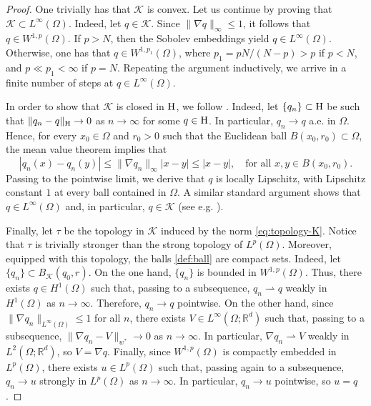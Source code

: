 \documentclass{article}
\newcommand{\boK}{\mathcal{K}}
\newcommand{\R}{\mathbb{R}}
\newcommand{\Hilb}{{\textnormal H}}
\theoremstyle{definition}
\begin{document}
        \begin{proof}
        One trivially has that $\boK$ is convex. Let us continue by proving that $\boK\subset L^\infty(\Omega)$. Indeed, let $q\in \boK$. Since $\|\nabla q\|_{\infty}\leq 1$, it follows that $q\in W^{1,p}(\Omega)$. If $p> N$, then the Sobolev embeddings yield $q\in L^\infty(\Omega)$. Otherwise, one has that $q\in W^{1,p_1}(\Omega)$, where $p_1=pN/(N-p)>p$ if $p<N$, and $p\ll p_1<\infty$ if $p=N$. Repeating the argument inductively, we arrive in a finite number of steps at $q\in L^\infty(\Omega)$.
        
        In order to show that $\boK$ is closed in $\Hilb$, we follow \cite[Lemma 2.2]{BerJebMaw}. Indeed, let $\{q_n\}\subset \Hilb$ be such that $\|q_n-q\|_\Hilb\to 0$ as $n\to\infty$ for some $q\in\Hilb$. In particular, $q_n\to q$ a.e. in $\Omega$. Hence, for every $x_0\in\Omega$ and $r_0>0$ such that the Euclidean ball $B(x_0,r_0)\subset\Omega$, the mean value theorem implies that
        \[|q_n(x)-q_n(y)|\leq \|\nabla q_n\|_\infty|x-y|\leq |x-y|,\quad\text{for all }x,y\in B(x_0,r_0).\]
        Passing to the pointwise limit, we derive that $q$ is locally Lipschitz, with Lipschitz constant $1$ at every ball contained in $\Omega$. A similar standard argument shows that $q\in L^\infty(\Omega)$ and, in particular, $q\in\boK$ (see e.g. \cite[Remark 4.2]{Heinonen}).

        Finally, let $\tau$ be the topology in $\boK$ induced by the norm \eqref{eq:topology-K}. Notice that $\tau$ is trivially stronger than the strong topology of $L^p(\Omega)$. Moreover, equipped with this topology, the balls \eqref{def:ball} are compact sets. Indeed, let $\{q_n\}\subset B_\boK(q_0,r)$. On the one hand, $\{q_n\}$ is bounded in $W^{1,p}(\Omega)$. Thus, there exists $q\in H^1(\Omega)$ such that, passing to a subsequence, $q_n\rightharpoonup q$ weakly in $H^1(\Omega)$ as $n\to\infty$. Therefore, $q_n\to q$ pointwise.
        On the other hand, since
        $\|\nabla q_n\|_{L^\infty(\Omega)}\leq 1$ for all $n$, there exists $V\in L^\infty(\Omega;\R^d)$ such that, passing to a subsequence, $\|\nabla q_n-V\|_{w^*}\to 0$ as $n\to\infty$. In particular, $\nabla q_n\rightharpoonup V$ weakly in $L^2(\Omega;\R^d)$, so $V=\nabla q$. Finally, since $W^{1,p}(\Omega)$ is compactly embedded in $L^p(\Omega)$, there exists $u\in L^p(\Omega)$ such that, passing again to a subsequence, $q_n\to u$ strongly in $L^p(\Omega)$ as $n\to\infty$. In particular, $q_n\to u$ pointwise, so $u=q$. 
    \end{proof}
\end{document}
